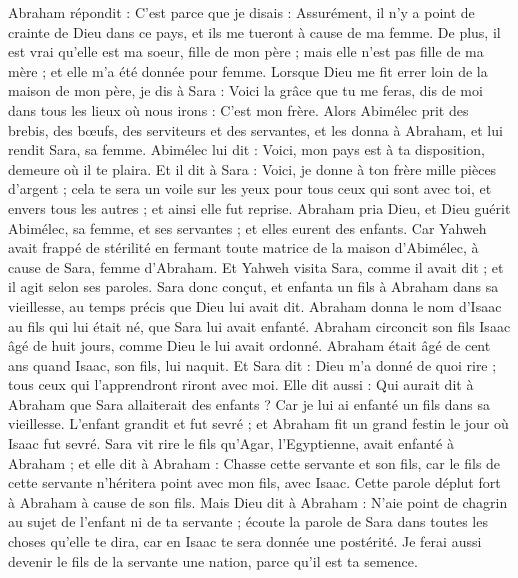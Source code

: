 \begin{multicols}{2}
Abraham répondit : C'est parce que je disais : Assurément, il n'y a point de crainte de Dieu dans ce pays, et ils me tueront à cause de ma femme.
De plus, il est vrai qu’elle est ma soeur, fille de mon père ; mais elle n'est pas fille de ma mère ; et elle m'a été donnée pour femme.
Lorsque Dieu me fit errer loin de la maison de mon père, je dis à Sara : Voici la grâce que tu me feras, dis de moi dans tous les lieux où nous irons : C'est mon frère.
Alors Abimélec prit des brebis, des bœufs, des serviteurs et des servantes, et les donna à Abraham, et lui rendit Sara, sa femme.
Abimélec lui dit : Voici, mon pays est à ta disposition, demeure où il te plaira.
Et il dit à Sara : Voici, je donne à ton frère mille pièces d'argent ; cela te sera un voile sur les yeux  pour tous ceux qui sont avec toi, et envers tous les autres ; et ainsi elle fut reprise.
Abraham pria Dieu, et Dieu guérit Abimélec, sa femme, et ses servantes ; et elles eurent des enfants.
Car Yahweh avait frappé de stérilité en  fermant toute matrice de la maison d'Abimélec, à cause de Sara, femme d'Abraham.
\VerseOne{}Et Yahweh visita Sara, comme il avait dit ; et il agit selon ses paroles.
Sara donc conçut, et enfanta un fils à Abraham dans sa vieillesse, au temps précis que Dieu lui avait dit.
Abraham donna le nom d’Isaac au fils qui lui était né, que Sara lui avait enfanté.
Abraham circoncit son fils Isaac âgé de huit jours, comme Dieu le lui avait ordonné.
Abraham était âgé de cent ans quand Isaac, son fils, lui naquit.
Et Sara dit : Dieu m'a donné de quoi rire ; tous ceux qui l'apprendront riront avec moi.
Elle dit aussi : Qui aurait dit à Abraham que Sara allaiterait des enfants ? Car je lui ai enfanté un fils dans sa vieillesse.
L'enfant grandit et fut sevré ; et Abraham fit un grand festin le jour où Isaac fut sevré.
Sara vit rire le fils qu’Agar, l’Egyptienne, avait enfanté à Abraham ;
et elle dit à Abraham : Chasse cette servante et son fils, car le fils de cette servante n'héritera point avec mon fils, avec Isaac.
Cette parole déplut fort à Abraham à cause de son fils.
Mais Dieu dit à Abraham : N'aie point de chagrin au sujet de l'enfant ni de ta servante ;  écoute la parole de Sara dans toutes les choses qu’elle te dira, car en Isaac te sera donnée une postérité.
Je ferai aussi devenir le fils de la servante une nation, parce qu'il est ta semence.

\end{multicols}
